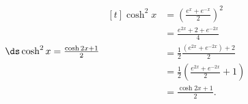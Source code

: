 {$\ds\cosh^2x = \frac{\cosh2x+1}{2}$}
{\hfill$\begin{aligned}[t]
		\cosh^2x &= \left(\frac{e^x+e^{-x}}{2}\right)^2  \\
											&= \frac{e^{2x} + 2 + e^{-2x}}{4} \\
											&= \frac12\frac{(e^{2x}  + e^{-2x})+2}{2}\\
											&= \frac12\left(\frac{e^{2x}  + e^{-2x}}{2}+1\right)\\
											&= \frac{\cosh2x+1}{2}.			
\end{aligned}$\hfill\null}
